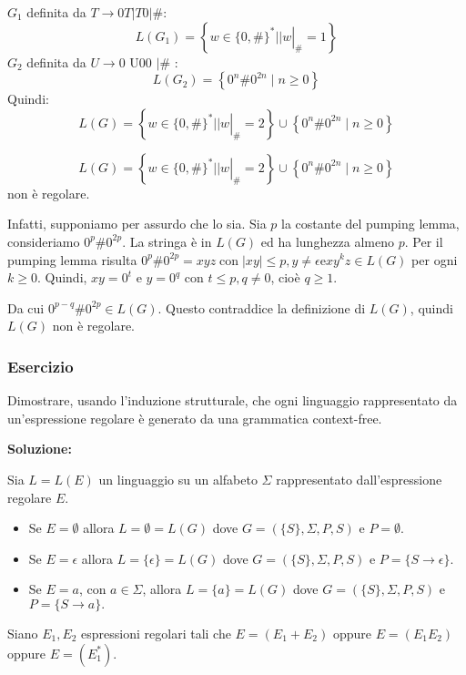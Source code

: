 \vspace{5mm}

$G_{1}$ definita da $T \rightarrow 0 T|T 0| \#:$
$$
L\left(G_{1}\right)=\left\{\left.w \in\{0, \#\}^{*}|| w\right|_{\#}=1\right\}
$$
$G_{2}$ definita da $U \rightarrow 0$ U00 $\mid \#$ :
$$
L\left(G_{2}\right)=\left\{0^{n} \# 0^{2 n} \mid n \geq 0\right\}
$$
Quindi:
$$
L(G)=\left\{\left.w \in\{0, \#\}^{*}|| w\right|_{\#}=2\right\} \cup\left\{0^{n} \# 0^{2 n} \mid n \geq 0\right\}
$$

\vspace{5mm}

$$
L(G)=\left\{\left.w \in\{0, \#\}^{*}|| w\right|_{\#}=2\right\} \cup\left\{0^{n} \# 0^{2 n} \mid n \geq 0\right\}
$$
non è regolare. 

Infatti, supponiamo per assurdo che lo sia. Sia $p$ la costante del pumping lemma, consideriamo $0^{p} \# 0^{2 p}$. La stringa è in $L(G)$ ed ha lunghezza almeno $p$. Per il pumping lemma risulta $0^{p} \# 0^{2 p}=x y z \operatorname{con}|x y| \leq p, y \neq \epsilon \mathrm{e} x y^{k} z \in L(G)$ per ogni $k \geq 0$. Quindi, $x y=0^{t}$ e $y=0^{q}$ con $t \leq p, q \neq 0$, cioè $q \geq 1$. 

Da cui $0^{p-q} \# 0^{2 p} \in L(G)$. Questo contraddice la definizione di $L(G)$, quindi $L(G)$ non è regolare.

\subsubsection{Esercizio}

Dimostrare, usando l'induzione strutturale, che ogni linguaggio
rappresentato da un'espressione regolare è generato da una
grammatica context-free.

\vspace{5mm}

\textbf{Soluzione:}

Sia $L=L(E)$ un linguaggio su un alfabeto $\Sigma$ rappresentato dall'espressione regolare $E$.
\begin{itemize}
    \item Se $E=\emptyset$ allora $L=\emptyset=L(G)$ dove $G=(\{S\}, \Sigma, P, S)$ e $P=\emptyset$.
    \item Se $E=\epsilon$ allora $L=\{\epsilon\}=L(G)$ dove $G=(\{S\}, \Sigma, P, S)$ e $P=\{S \rightarrow \epsilon\} .$
    \item Se $E=a$, con $a \in \Sigma$, allora $L=\{a\}=L(G)$ dove $G=(\{S\}, \Sigma, P, S)$ e $P=\{S \rightarrow a\} .$
\end{itemize}
Siano $E_{1}, E_{2}$ espressioni regolari tali che $E=\left(E_{1}+E_{2}\right)$ oppure $E=\left(E_{1} E_{2}\right)$ oppure $E=\left(E_{1}^{*}\right)$.

